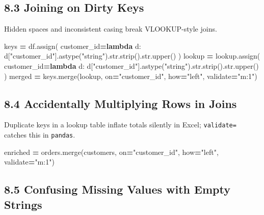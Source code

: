 \documentclass[
  12pt,
]{article}
\newenvironment{Shaded}{\begin{snugshade}}{\end{snugshade}}
\newcommand{\BuiltInTok}[1]{#1}
\newcommand{\KeywordTok}[1]{\textcolor[rgb]{0.13,0.29,0.53}{\textbf{#1}}}
\newcommand{\NormalTok}[1]{#1}
\newcommand{\OperatorTok}[1]{\textcolor[rgb]{0.81,0.36,0.00}{\textbf{#1}}}
\newcommand{\StringTok}[1]{\textcolor[rgb]{0.31,0.60,0.02}{#1}}
\begin{document}
\subsection{8.3 Joining on Dirty Keys}\label{joining-on-dirty-keys}

Hidden spaces and inconsistent casing break VLOOKUP-style joins.

\begin{Shaded}
\begin{Highlighting}[]
\NormalTok{keys }\OperatorTok{=}\NormalTok{ df.assign(}
\NormalTok{    customer\_id}\OperatorTok{=}\KeywordTok{lambda}\NormalTok{ d: d[}\StringTok{"customer\_id"}\NormalTok{].astype(}\StringTok{"string"}\NormalTok{).}\BuiltInTok{str}\NormalTok{.strip().}\BuiltInTok{str}\NormalTok{.upper()}
\NormalTok{)}
\NormalTok{lookup }\OperatorTok{=}\NormalTok{ lookup.assign(}
\NormalTok{    customer\_id}\OperatorTok{=}\KeywordTok{lambda}\NormalTok{ d: d[}\StringTok{"customer\_id"}\NormalTok{].astype(}\StringTok{"string"}\NormalTok{).}\BuiltInTok{str}\NormalTok{.strip().}\BuiltInTok{str}\NormalTok{.upper()}
\NormalTok{)}
\NormalTok{merged }\OperatorTok{=}\NormalTok{ keys.merge(lookup, on}\OperatorTok{=}\StringTok{"customer\_id"}\NormalTok{, how}\OperatorTok{=}\StringTok{"left"}\NormalTok{, validate}\OperatorTok{=}\StringTok{"m:1"}\NormalTok{)}
\end{Highlighting}
\end{Shaded}

\subsection{8.4 Accidentally Multiplying Rows in
Joins}\label{accidentally-multiplying-rows-in-joins}

Duplicate keys in a lookup table inflate totals silently in Excel;
\texttt{validate=} catches this in \texttt{pandas}.

\begin{Shaded}
\begin{Highlighting}[]
\NormalTok{enriched }\OperatorTok{=}\NormalTok{ orders.merge(customers, on}\OperatorTok{=}\StringTok{"customer\_id"}\NormalTok{, how}\OperatorTok{=}\StringTok{"left"}\NormalTok{, validate}\OperatorTok{=}\StringTok{"m:1"}\NormalTok{)}
\end{Highlighting}
\end{Shaded}

\subsection{8.5 Confusing Missing Values with Empty
Strings}\label{confusing-missing-values-with-empty-strings}
\end{document}

